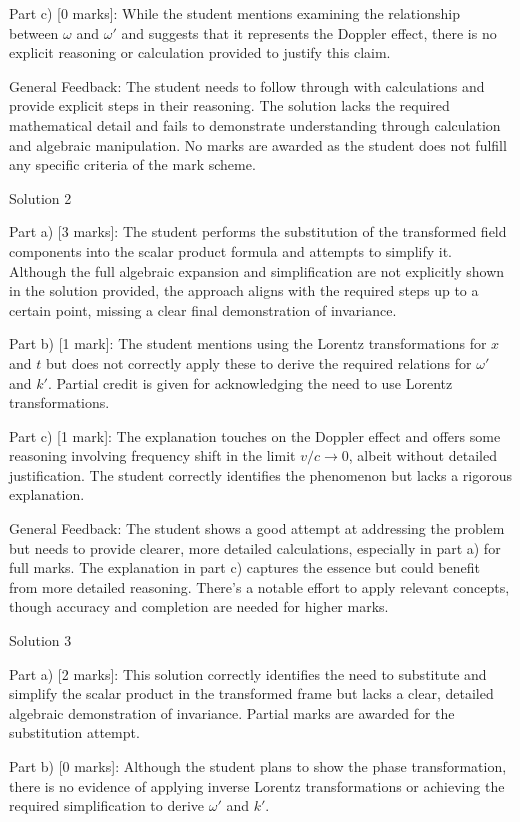 \documentclass[a4paper,11pt]{article}
\begin{document}
Part c) [0 marks]: While the student mentions examining the relationship between \(\omega\) and \(\omega'\) and suggests that it represents the Doppler effect, there is no explicit reasoning or calculation provided to justify this claim.

General Feedback: The student needs to follow through with calculations and provide explicit steps in their reasoning. The solution lacks the required mathematical detail and fails to demonstrate understanding through calculation and algebraic manipulation. No marks are awarded as the student does not fulfill any specific criteria of the mark scheme.

Solution 2

Part a) [3 marks]: The student performs the substitution of the transformed field components into the scalar product formula and attempts to simplify it. Although the full algebraic expansion and simplification are not explicitly shown in the solution provided, the approach aligns with the required steps up to a certain point, missing a clear final demonstration of invariance.

Part b) [1 mark]: The student mentions using the Lorentz transformations for \(x\) and \(t\) but does not correctly apply these to derive the required relations for \(\omega'\) and \(k'\). Partial credit is given for acknowledging the need to use Lorentz transformations.

Part c) [1 mark]: The explanation touches on the Doppler effect and offers some reasoning involving frequency shift in the limit \( v/c \rightarrow 0\), albeit without detailed justification. The student correctly identifies the phenomenon but lacks a rigorous explanation.

General Feedback: The student shows a good attempt at addressing the problem but needs to provide clearer, more detailed calculations, especially in part a) for full marks. The explanation in part c) captures the essence but could benefit from more detailed reasoning. There's a notable effort to apply relevant concepts, though accuracy and completion are needed for higher marks.

Solution 3

Part a) [2 marks]: This solution correctly identifies the need to substitute and simplify the scalar product in the transformed frame but lacks a clear, detailed algebraic demonstration of invariance. Partial marks are awarded for the substitution attempt.

Part b) [0 marks]: Although the student plans to show the phase transformation, there is no evidence of applying inverse Lorentz transformations or achieving the required simplification to derive \(\omega'\) and \(k'\).
\end{document}
